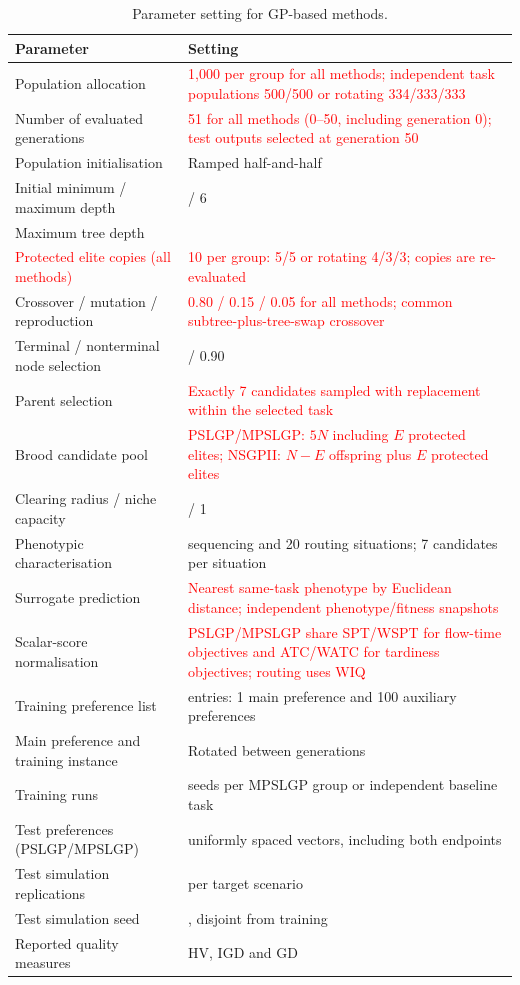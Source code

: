 \documentclass[10pt,journal]{IEEEtran}
\newcommand{\key}[1]{\textcolor{red}{#1}}
\begin{document}
\begin{table}[t]
\centering
\caption{Parameter setting for GP-based methods.}
\label{tab:common-parameters}
\footnotesize
\renewcommand{\arraystretch}{1.08}
\begin{tabular}{@{}>{\raggedright\arraybackslash}p{}>{\raggedright\arraybackslash}p{}@{}}
\toprule
Parameter & Setting \\
\midrule
Population allocation & \key{1,000 per group for all methods; independent task populations 500/500 or rotating 334/333/333} \\
Number of evaluated generations & \key{51 for all methods (0--50, including generation 0); test outputs selected at generation 50} \\
Population initialisation & Ramped half-and-half \\
Initial minimum / maximum depth & 2 / 6 \\
Maximum tree depth & 8 \\
\key{Protected elite copies (all methods)} & \key{10 per group: 5/5 or rotating 4/3/3; copies are re-evaluated} \\
Crossover / mutation / reproduction & \key{0.80 / 0.15 / 0.05 for all methods; common subtree-plus-tree-swap crossover} \\
Terminal / nonterminal node selection & 0.10 / 0.90 \\
Parent selection & \key{Exactly 7 candidates sampled with replacement within the selected task} \\
\midrule
Brood candidate pool & \key{PSLGP/MPSLGP: $5N$ including $E$ protected elites; NSGPII: $N-E$ offspring plus $E$ protected elites} \\
Clearing radius / niche capacity & 0 / 1 \\
Phenotypic characterisation & 20 sequencing and 20 routing situations; 7 candidates per situation \\
Surrogate prediction & \key{Nearest same-task phenotype by Euclidean distance; independent phenotype/fitness snapshots} \\
Scalar-score normalisation & \key{PSLGP/MPSLGP share SPT/WSPT for flow-time objectives and ATC/WATC for tardiness objectives; routing uses WIQ} \\
Training preference list & 101 entries: 1 main preference and 100 auxiliary preferences \\
Main preference and training instance & Rotated between generations \\
\midrule
Training runs & 30 seeds per MPSLGP group or independent baseline task \\
Test preferences (PSLGP/MPSLGP) & 200 uniformly spaced vectors, including both endpoints \\
Test simulation replications & 30 per target scenario \\
Test simulation seed & 968356, disjoint from training \\
Reported quality measures & HV, IGD and GD \\
\bottomrule
\end{tabular}
\end{table}
\end{document}
